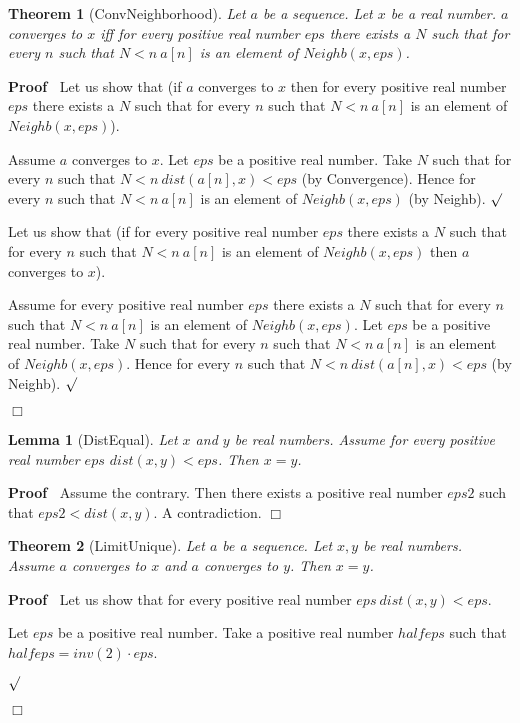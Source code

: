 \documentclass{article}
\newenvironment{forthel}{\begin{leftbar}}{\end{leftbar}}
\newenvironment{proof}{\noindent\textbf{Proof\ }}{\hspace*{\fill}$\Box$\medskip}
\newenvironment{subproof}{\begin{list}{}{}
		\item[\text{Proof}]}{\hfill $\surd$ \end{list}}
\newtheorem{lemma}{Lemma}
\newtheorem{theorem}{Theorem}
\begin{document}
\begin{forthel}
	\begin{theorem} [ConvNeighborhood]
	Let $a$ be a sequence. Let $x$ be a real number.
	$a$ converges to $x$ iff for every positive real number $eps$ there exists a $N$
	such that for every $n$ such that $N < n \ a[n]$ is an element of $Neighb(x,eps)$.
	\end{theorem}
	\begin{proof}
	Let us show that (if $a$ converges to $x$ then for every positive real number $eps$ there exists a $N$
	such that for every $n$ such that $N < n \ a[n]$ is an element of $Neighb(x,eps)$).
	\begin{subproof}
	Assume $a$ converges to $x$.
	Let $eps$ be a positive real number.
	Take $N$ such that for every $n$ such that $N < n \ dist(a[n],x) < eps$ (by Convergence).
	Hence for every $n$ such that $N < n \ a[n]$ is an element of $Neighb(x,eps)$ (by Neighb).
	\end{subproof}
	
	Let us show that (if for every positive real number $eps$ there exists a $N$ such that
	for every $n$ such that $N < n \ a[n]$ is an element of $Neighb(x,eps)$ then $a$ converges to $x$).
	\begin{subproof}
	Assume for every positive real number $eps$ there exists a $N$ such that
	for every $n$ such that $N < n \ a[n]$ is an element of $Neighb(x,eps)$.
	Let $eps$ be a positive real number.
	Take $N$ such that for every $n$ such that $N < n \ a[n]$ is an element of $Neighb(x,eps)$.
	Hence for every $n$ such that $N < n \ dist(a[n],x) < eps$ (by Neighb).
	\end{subproof}
	\end{proof}	
	
	\begin{lemma} [DistEqual]
	Let $x$ and $y$ be real numbers. Assume for every positive real number $eps$ $dist(x,y) < eps$.
	Then $x = y$.
	\end{lemma}
	\begin{proof}
	Assume the contrary.
	Then there exists a positive real number $eps2$ such that $eps2 < dist(x,y)$.
	A contradiction.
	\end{proof}
	
	\begin{theorem} [LimitUnique]
	Let $a$ be a sequence. Let $x, y$ be real numbers. Assume $a$ converges to $x$ and $a$ converges to $y$.
	Then $x = y$.
	\end{theorem}
	\begin{proof}
	Let us show that for every positive real number $eps \ dist(x,y) < eps$.
	\begin{subproof}
	Let $eps$ be a positive real number.
	Take a positive real number $halfeps$ such that $halfeps = inv(2) \cdot eps$.
	

\end{subproof}
\end{proof}
\end{forthel}
\end{document}
